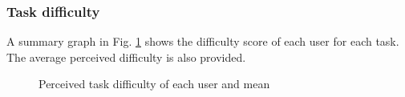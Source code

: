     \subsubsection{Task difficulty}
    A summary graph in Fig. \ref{ResultsDifficulty} shows the difficulty score of each user for each task. The average perceived difficulty is also provided.
    \begin{figure}[!ht]
        \begin{minipage}{\linewidth}
            \centering
            \captionsetup{justification=centering}
            \caption{Perceived task difficulty of each user and mean}
            \label{ResultsDifficulty}
        \end{minipage}
    \end{figure}


